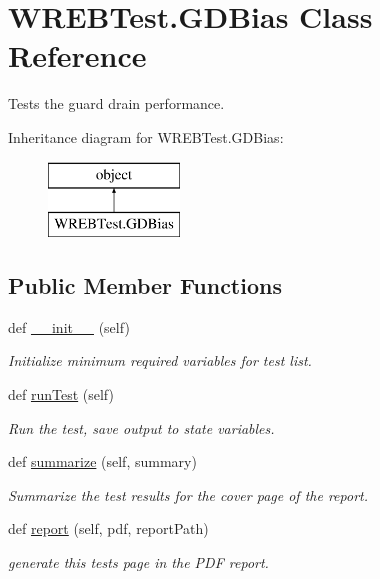 \hypertarget{class_w_r_e_b_test_1_1_g_d_bias}{}\section{W\+R\+E\+B\+Test.\+G\+D\+Bias Class Reference}
\label{class_w_r_e_b_test_1_1_g_d_bias}


Tests the guard drain performance.  


Inheritance diagram for W\+R\+E\+B\+Test.\+G\+D\+Bias\+:\begin{figure}[H]
\begin{center}
\leavevmode
\includegraphics[height=2.000000cm]{class_w_r_e_b_test_1_1_g_d_bias}
\end{center}
\end{figure}
\subsection*{Public Member Functions}
\begin{DoxyCompactItemize}
\item 
def \hyperlink{class_w_r_e_b_test_1_1_g_d_bias_acf053e4e6e21e4a84814cfeb775f4c6b}{\+\_\+\+\_\+init\+\_\+\+\_\+} (self)
\begin{DoxyCompactList}\small\item\em Initialize minimum required variables for test list. \end{DoxyCompactList}\item 
def \hyperlink{class_w_r_e_b_test_1_1_g_d_bias_a994b19e58792f80591e2dc4dd4629bea}{run\+Test} (self)
\begin{DoxyCompactList}\small\item\em Run the test, save output to state variables. \end{DoxyCompactList}\item 
def \hyperlink{class_w_r_e_b_test_1_1_g_d_bias_a06f39560e8ecafd5299efd10e28dd7e9}{summarize} (self, summary)
\begin{DoxyCompactList}\small\item\em Summarize the test results for the cover page of the report. \end{DoxyCompactList}\item 
def \hyperlink{class_w_r_e_b_test_1_1_g_d_bias_aa746eb8d8380715861c1ea6c64956167}{report} (self, pdf, report\+Path)
\begin{DoxyCompactList}\small\item\em generate this test\textquotesingle{}s page in the P\+DF report. \end{DoxyCompactList}\end{DoxyCompactItemize}


